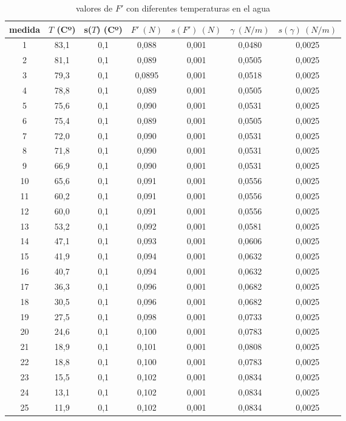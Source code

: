 \documentclass[10pt,a4paper]{article}
\begin{document}
\begin{table}[h] %
\begin{center}
\begin{tabular}{|c|c|c|c|c|c|c|}
\hline 
medida & $T$ (Cº) & s($T$) (Cº) & $F' \ (N)$ & $ s(F') \ (N) $ & $\gamma \ (N/m)$ & $s(\gamma) \ (N/m)$
  	\\  \hline
1 & 	 83,1 & 	 0,1 & 	 0,088 & 	 0,001 & 	 0,0480 & 	 0,0025
  	\\ 
2 & 	 81,1 & 	 0,1 & 	 0,089 & 	 0,001 & 	 0,0505 & 	 0,0025
  	\\ 
3 & 	 79,3 & 	 0,1 & 	 0,0895 & 	 0,001 & 	 0,0518 & 	 0,0025
  	\\ 
4 & 	 78,8 & 	 0,1 & 	 0,089 & 	 0,001 & 	 0,0505 & 	 0,0025
  	\\ 
5 & 	 75,6 & 	 0,1 & 	 0,090 & 	 0,001 & 	 0,0531 & 	 0,0025
  	\\ 
6 & 	 75,4 & 	 0,1 & 	 0,089 & 	 0,001 & 	 0,0505 & 	 0,0025
  	\\ 
7 & 	 72,0 & 	 0,1 & 	 0,090 & 	 0,001 & 	 0,0531 & 	 0,0025
  	\\ 
8 & 	 71,8 & 	 0,1 & 	 0,090 & 	 0,001 & 	 0,0531 & 	 0,0025
  	\\ 
9 & 	 66,9 & 	 0,1 & 	 0,090 & 	 0,001 & 	 0,0531 & 	 0,0025
  	\\ 
10 & 	 65,6 & 	 0,1 & 	 0,091 & 	 0,001 & 	 0,0556 & 	 0,0025
  	\\ 
11 & 	 60,2 & 	 0,1 & 	 0,091 & 	 0,001 & 	 0,0556 & 	 0,0025
  	\\ 
12 & 	 60,0 & 	 0,1 & 	 0,091 & 	 0,001 & 	 0,0556 & 	 0,0025
  	\\ 
13 & 	 53,2 & 	 0,1 & 	 0,092 & 	 0,001 & 	 0,0581 & 	 0,0025
  	\\ 
14 & 	 47,1 & 	 0,1 & 	 0,093 & 	 0,001 & 	 0,0606 & 	 0,0025
  	\\ 
15 & 	 41,9 & 	 0,1 & 	 0,094 & 	 0,001 & 	 0,0632 & 	 0,0025
  	\\ 
16 & 	 40,7 & 	 0,1 & 	 0,094 & 	 0,001 & 	 0,0632 & 	 0,0025
  	\\ 
17 & 	 36,3 & 	 0,1 & 	 0,096 & 	 0,001 & 	 0,0682 & 	 0,0025
  	\\ 
18 & 	 30,5 & 	 0,1 & 	 0,096 & 	 0,001 & 	 0,0682 & 	 0,0025
  	\\ 
19 & 	 27,5 & 	 0,1 & 	 0,098 & 	 0,001 & 	 0,0733 & 	 0,0025
  	\\ 
20 & 	 24,6 & 	 0,1 & 	 0,100 & 	 0,001 & 	 0,0783 & 	 0,0025
  	\\ 
21 & 	 18,9 & 	 0,1 & 	 0,101 & 	 0,001 & 	 0,0808 & 	 0,0025
  	\\ 
22 & 	 18,8 & 	 0,1 & 	 0,100 & 	 0,001 & 	 0,0783 & 	 0,0025
  	\\ 
23 & 	 15,5 & 	 0,1 & 	 0,102 & 	 0,001 & 	 0,0834 & 	 0,0025
  	\\ 
24 & 	 13,1 & 	 0,1 & 	 0,102 & 	 0,001 & 	 0,0834 & 	 0,0025
  	\\ 
25 & 	 11,9 & 	 0,1 & 	 0,102 & 	 0,001 & 	 0,0834 & 	 0,0025
  	\\  \hline
\end{tabular}
\caption{valores de $F'$ con diferentes temperaturas en el agua}
\label{tab:t vs f'}
\end{center}
\end{table}
\end{document}
